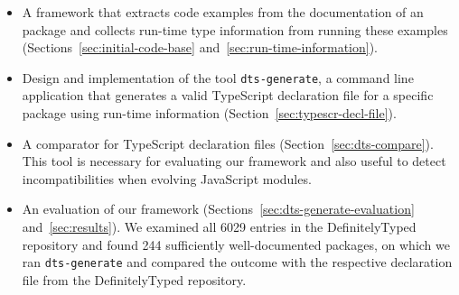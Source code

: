 \documentclass[english,cleveref,autoref,submission]{programming}
\begin{document}
\begin{itemize}
\item A framework that extracts code examples from the
  documentation of an \NPM{} package and collects run-time type
  information from running these examples (Sections~\ref{sec:initial-code-base}
  and~\ref{sec:run-time-information}). 

\item Design and implementation of the tool \texttt{dts-generate}, a command line
  application that generates a valid TypeScript declaration file for a
  specific \NPM{} package using run-time information (Section~\ref{sec:typescr-decl-file}).

\item A comparator for TypeScript declaration files (Section~\ref{sec:dts-compare}). This tool is
  necessary for evaluating our framework and also useful to detect
  incompatibilities when evolving JavaScript modules.
\item An evaluation of our framework (Sections~\ref{sec:dts-generate-evaluation}
  and~\ref{sec:results}). We examined all 6029 entries in 
  the DefinitelyTyped repository and found 244 sufficiently
  well-documented \NPM{} packages, on which we ran \texttt{dts-generate}
  and compared the outcome with the respective declaration file from the
  DefinitelyTyped repository. 
\end{itemize}
\end{document}

